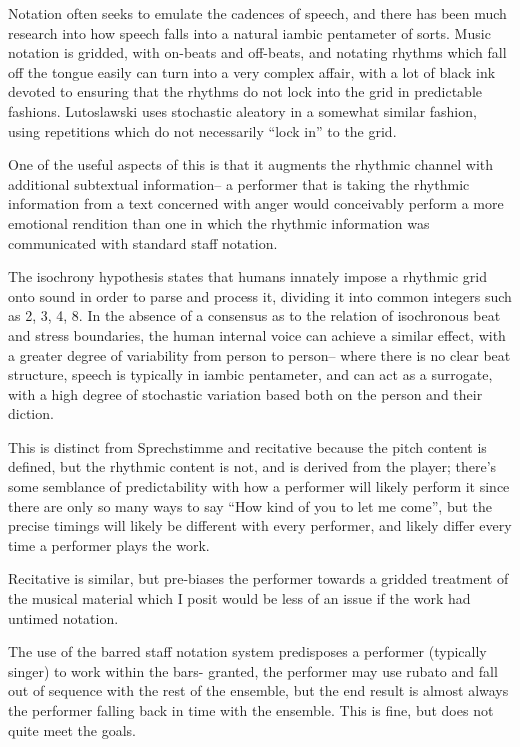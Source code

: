 Notation often seeks to emulate the cadences of speech, and there has been much research into how speech falls into a natural iambic pentameter of sorts. 
Music notation is gridded, with on-beats and off-beats, and notating rhythms which fall off the tongue easily can turn into a very complex affair, with a lot of black ink devoted to ensuring that the rhythms do not lock into the grid in predictable fashions. 
Lutoslawski uses stochastic aleatory in a somewhat similar fashion, using repetitions which do not necessarily ``lock in'' to the grid.

One of the useful aspects of this is that it augments the rhythmic channel with additional subtextual information-- a performer that is taking the rhythmic information from a text concerned with anger would conceivably perform a more emotional rendition than one in which the rhythmic information was communicated with standard staff notation.

The isochrony hypothesis states that humans innately impose a rhythmic grid onto sound in order to parse and process it, dividing it into common integers such as 2, 3, 4, 8. 
In the absence of a consensus as to the relation of isochronous beat and stress boundaries, the human internal voice can achieve a similar effect, with a greater degree of variability from person to person-- 
where there is no clear beat structure, speech is typically in iambic pentameter, and can act as a surrogate, with a high degree of stochastic variation based both on the person and their diction. 

This is distinct from Sprechstimme and recitative because the pitch content is defined, but the rhythmic content is not, and is derived from the player; 
there's some semblance of predictability with how a performer will likely perform it since there are only so many ways to say ``How kind of you to let me come'', but the precise timings will likely be different with every performer, and likely differ every time a performer plays the work. 

Recitative is similar, but pre-biases the performer towards a gridded treatment of the musical material which I posit would be less of an issue if the work had untimed notation. 

The use of the barred staff notation system predisposes a performer (typically singer) to work within the bars- granted, the performer may use rubato and fall out of sequence with the rest of the ensemble, but the end result is almost always the performer falling back in time with the ensemble. 
This is fine, but does not quite meet the goals.


